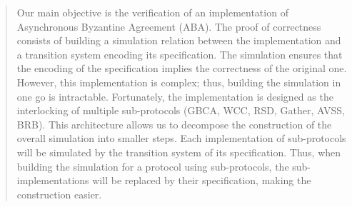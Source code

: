 
%

\begin{abstract}
    Our main objective is the verification of an implementation of Asynchronous Byzantine
    Agreement (ABA). The proof of correctness consists of building a simulation relation between
    the implementation and a transition system encoding its specification. The simulation
    ensures that the encoding of the specification implies the correctness of the
    original one. However, this implementation is complex; thus, building the simulation in one
    go is intractable. Fortunately, the implementation is designed as the interlocking of
    multiple sub-protocols (GBCA, WCC, RSD, Gather, AVSS, BRB). This architecture allows us to
    decompose the construction of the overall simulation into smaller steps. Each implementation
    of sub-protocols will be simulated by the transition system of its specification. Thus, when 
    building the simulation for a protocol using sub-protocols, the sub-implementations will be 
    replaced by their specification, making the construction easier.
\end{abstract}







\appendix



